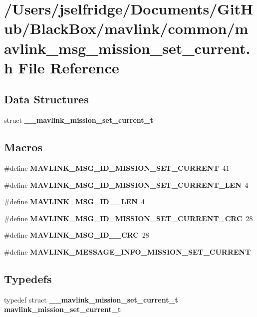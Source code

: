 \section{/\+Users/jselfridge/\+Documents/\+Git\+Hub/\+Black\+Box/mavlink/common/mavlink\+\_\+msg\+\_\+mission\+\_\+set\+\_\+current.h File Reference}
\label{mavlink__msg__mission__set__current_8h}
\subsection*{Data Structures}
\begin{DoxyCompactItemize}
\item 
struct \textbf{ \+\_\+\+\_\+mavlink\+\_\+mission\+\_\+set\+\_\+current\+\_\+t}
\end{DoxyCompactItemize}
\subsection*{Macros}
\begin{DoxyCompactItemize}
\item 
\#define \textbf{ M\+A\+V\+L\+I\+N\+K\+\_\+\+M\+S\+G\+\_\+\+I\+D\+\_\+\+M\+I\+S\+S\+I\+O\+N\+\_\+\+S\+E\+T\+\_\+\+C\+U\+R\+R\+E\+NT}~41
\item 
\#define \textbf{ M\+A\+V\+L\+I\+N\+K\+\_\+\+M\+S\+G\+\_\+\+I\+D\+\_\+\+M\+I\+S\+S\+I\+O\+N\+\_\+\+S\+E\+T\+\_\+\+C\+U\+R\+R\+E\+N\+T\+\_\+\+L\+EN}~4
\item 
\#define \textbf{ M\+A\+V\+L\+I\+N\+K\+\_\+\+M\+S\+G\+\_\+\+I\+D\+\_\+\_\+\+L\+EN}~4
\item 
\#define \textbf{ M\+A\+V\+L\+I\+N\+K\+\_\+\+M\+S\+G\+\_\+\+I\+D\+\_\+\+M\+I\+S\+S\+I\+O\+N\+\_\+\+S\+E\+T\+\_\+\+C\+U\+R\+R\+E\+N\+T\+\_\+\+C\+RC}~28
\item 
\#define \textbf{ M\+A\+V\+L\+I\+N\+K\+\_\+\+M\+S\+G\+\_\+\+I\+D\+\_\+\_\+\+C\+RC}~28
\item 
\#define \textbf{ M\+A\+V\+L\+I\+N\+K\+\_\+\+M\+E\+S\+S\+A\+G\+E\+\_\+\+I\+N\+F\+O\+\_\+\+M\+I\+S\+S\+I\+O\+N\+\_\+\+S\+E\+T\+\_\+\+C\+U\+R\+R\+E\+NT}
\end{DoxyCompactItemize}
\subsection*{Typedefs}
\begin{DoxyCompactItemize}
\item 
typedef struct \textbf{ \+\_\+\+\_\+mavlink\+\_\+mission\+\_\+set\+\_\+current\+\_\+t} \textbf{ mavlink\+\_\+mission\+\_\+set\+\_\+current\+\_\+t}
\end{DoxyCompactItemize}


